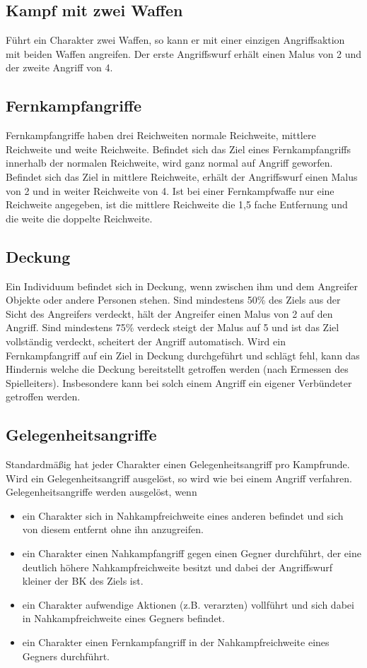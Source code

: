 \documentclass[../../Heldenanleitung2]{subfiles}
\begin{document}
\subsection{Kampf mit zwei Waffen}
Führt ein Charakter zwei Waffen, so kann er mit einer einzigen Angriffsaktion mit beiden Waffen angreifen. Der erste Angriffswurf erhält einen Malus von 2 und der zweite Angriff von 4.

\subsection{Fernkampfangriffe}
Fernkampfangriffe haben drei Reichweiten normale Reichweite, mittlere Reichweite und weite Reichweite. Befindet sich das Ziel eines Fernkampfangriffs innerhalb der normalen Reichweite, wird ganz normal auf Angriff geworfen. Befindet sich das Ziel in mittlere Reichweite, erhält der Angriffswurf einen Malus von 2 und in weiter Reichweite von 4. Ist bei einer Fernkampfwaffe nur eine Reichweite angegeben, ist die mittlere Reichweite die 1,5 fache Entfernung und die weite die doppelte Reichweite.

\subsection{Deckung}
Ein Individuum befindet sich in Deckung, wenn zwischen ihm und dem Angreifer Objekte oder andere Personen stehen. Sind mindestens 50\% des Ziels aus der Sicht des Angreifers verdeckt, hält der Angreifer einen Malus von 2 auf den Angriff. Sind mindestens 75\% verdeck steigt der Malus auf 5 und ist das Ziel vollständig verdeckt, scheitert der Angriff automatisch. Wird ein Fernkampfangriff auf ein Ziel in Deckung durchgeführt und schlägt fehl, kann das Hindernis welche die Deckung bereitstellt getroffen werden (nach Ermessen des Spielleiters). Insbesondere kann bei solch einem Angriff ein eigener Verbündeter getroffen werden.

\subsection{Gelegenheitsangriffe}
Standardmäßig hat jeder Charakter einen Gelegenheitsangriff pro Kampfrunde. Wird ein Gelegenheitsangriff ausgelöst, so wird wie bei einem Angriff verfahren. Gelegenheitsangriffe werden ausgelöst, wenn
\begin{itemize}
	\item ein Charakter sich in Nahkampfreichweite eines anderen befindet und sich von diesem entfernt ohne ihn anzugreifen.
	\item ein Charakter einen Nahkampfangriff gegen einen Gegner durchführt, der eine deutlich höhere Nahkampfreichweite besitzt und dabei der Angriffswurf kleiner der BK des Ziels ist.
	\item ein Charakter aufwendige Aktionen (z.B. verarzten) vollführt und sich dabei in Nahkampfreichweite eines Gegners befindet.
	\item ein Charakter einen Fernkampfangriff in der Nahkampfreichweite eines Gegners durchführt.
\end{itemize}
\end{document}
